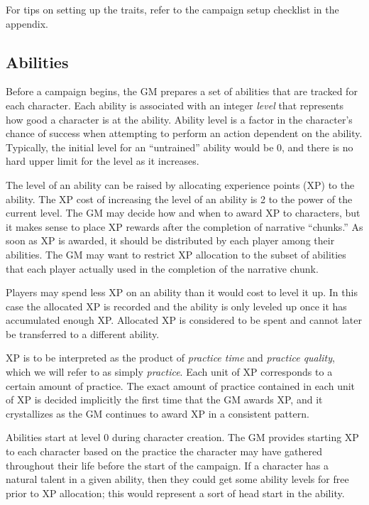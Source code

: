 For tips on setting up the traits, refer to the campaign setup checklist in the appendix.

\subsection{Abilities}
Before a campaign begins, the GM prepares a set of abilities that are tracked for each character.
Each ability is associated with an integer \emph{level} that represents how good a character is at the ability.
Ability level is a factor in the character’s chance of success when attempting to perform an action dependent on the ability.
Typically, the initial level for an ``untrained'' ability would be $0$, and there is no hard upper limit for the level as it increases.

The level of an ability can be raised by allocating experience points (XP) to the ability.
The XP cost of increasing the level of an ability is 2 to the power of the current level.
The GM may decide how and when to award XP to characters, but it makes sense to place XP rewards after the completion of narrative ``chunks.''
As soon as XP is awarded, it should be distributed by each player among their abilities.
The GM may want to restrict XP allocation to the subset of abilities that each player actually used in the completion of the narrative chunk.

Players may spend less XP on an ability than it would cost to level it up.
In this case the allocated XP is recorded and the ability is only leveled up once it has accumulated enough XP.
Allocated XP is considered to be spent and cannot later be transferred to a different ability.

XP is to be interpreted as the product of \emph{practice time} and \emph{practice quality}, which we will refer to as simply \emph{practice}.
Each unit of XP corresponds to a certain amount of practice.
The exact amount of practice contained in each unit of XP is decided implicitly the first time that the GM awards XP,
and it crystallizes as the GM continues to award XP in a consistent pattern.

Abilities start at level 0 during character creation.
The GM provides starting XP to each character based on the practice the character may have gathered throughout their life before the start of the campaign.
If a character has a natural talent in a given ability,
then they could get some ability levels for free prior to XP allocation; this would represent a sort of head start in the ability.

